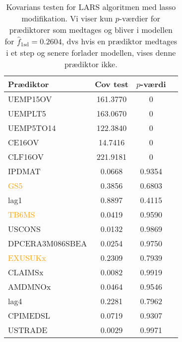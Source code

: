 \begin{table}[ht] 
\centering 
\begin{tabular}{lccc}
\toprule
Prædiktor & Cov test & \(p\)-værdi \\
\midrule
\textcolor{blue3}{UEMP15OV}    &       161.3770  &0\\
\textcolor{blue3}{UEMPLT5}   &      163.0670 & 0\\
\textcolor{blue3}{UEMP5TO14}    &    122.3840&  0\\
\textcolor{blue3}{CE16OV}         &   14.7416 & 0\\
\textcolor{blue3}{CLF16OV}        &   221.9181 & 0\\
\textcolor{chartreuse4}{IPDMAT}         &    0.0668&  0.9354\\
\textcolor{orange}{GS5}&   0.3856 & 0.6803\\
\textcolor{blue3}{lag1}       &      0.8897 & 0.4115\\
\textcolor{orange}{TB6MS}  &    0.0419 & 0.9590\\
\textcolor{blue3}{USCONS} &    0.0132&  0.9869\\
\textcolor{blue3}{ DPCERA3M086SBEA}          &  0.0254 & 0.9750\\
\textcolor{orange}{ EXUSUKx} &     0.2309 & 0.7939\\
\textcolor{blue3}{CLAIMSx} &      0.0082 &  0.9919\\
\textcolor{red3}{ AMDMNOx}  &     0.0464 & 0.9546\\
\textcolor{blue3}{lag4 }     &    0.2281&  0.7962\\
\textcolor{cadetblue2}{CPIMEDSL}  &   0.0719&  0.9307\\
\textcolor{blue3}{USTRADE}   &     0.0029 &  0.9971\\ \bottomrule
\end{tabular}
\caption{Kovarians testen for LARS algoritmen med lasso modifikation.
Vi viser kun \(p\)-værdier for prædiktorer som medtages og bliver i modellen for \(\widehat{f}_{1\text{sd}}=0.2604\), dvs hvis en prædiktor medtages i et step og senere forlader modellen, vises denne prædiktor ikke.} \label{tab:covTest_bic}
\end{table} 
